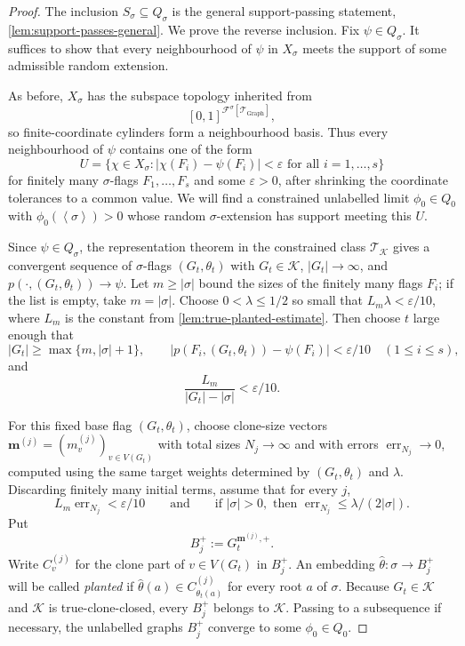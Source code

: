 \documentclass[11pt]{article}
\theoremstyle{definition}
\newcommand{\F}{\mathcal{F}}
\newcommand{\K}{\mathcal{K}}
\newcommand{\T}{\mathcal{T}}
\newcommand{\brak}[1]{\left\langle #1\right\rangle}
\newcommand{\eps}{\varepsilon}
\begin{document}
\begin{proof}
The inclusion $S_\sigma\subseteq Q_\sigma$ is the general support-passing
statement, \cref{lem:support-passes-general}.  We prove the reverse inclusion.
Fix $\psi\in Q_\sigma$.  It suffices to show that every neighbourhood of $\psi$
in $X_\sigma$ meets the support of some admissible random extension.

As before, $X_\sigma$ has the subspace topology inherited from
\[
  [0,1]^{\F^\sigma[\T_{\mathrm{Graph}}]},
\]
so finite-coordinate cylinders form a neighbourhood basis.  Thus every
neighbourhood of $\psi$ contains one of the form
\[
  U=
  \{\chi\in X_\sigma:
    |\chi(F_i)-\psi(F_i)|<\eps\text{ for all }i=1,\ldots,s\}
\]
for finitely many $\sigma$-flags $F_1,\ldots,F_s$ and some $\eps>0$, after
shrinking the coordinate tolerances to a common value.  We will find a
constrained unlabelled limit $\phi_0\in Q_0$ with $\phi_0(\brak\sigma)>0$ whose
random $\sigma$-extension has support meeting this $U$.

Since $\psi\in Q_\sigma$, the representation theorem in the constrained class
$\T_\K$ gives a convergent sequence of $\sigma$-flags
$(G_t,\theta_t)$ with $G_t\in\K$, $|G_t|\to\infty$, and
$p(\cdot,(G_t,\theta_t))\to\psi$.  Let $m\ge|\sigma|$ bound the sizes of the
finitely many flags $F_i$; if the list is empty, take $m=|\sigma|$.  Choose
$0<\lambda\le1/2$ so small that $L_m\lambda<\eps/10$, where $L_m$ is the
constant from \cref{lem:true-planted-estimate}.  Then choose $t$ large enough
that
\[
  |G_t|\ge\max\{m,|\sigma|+1\},\qquad
  |p(F_i,(G_t,\theta_t))-\psi(F_i)|<\eps/10\quad(1\le i\le s),
\]
and
\[
  \frac{L_m}{|G_t|-|\sigma|}<\eps/10 .
\]

For this fixed base flag $(G_t,\theta_t)$, choose clone-size vectors
$\mathbf m^{(j)}=(m_v^{(j)})_{v\in V(G_t)}$ with total sizes $N_j\to\infty$ and
with errors $\operatorname{err}_{N_j}\to0$, computed using the same target
weights determined by $(G_t,\theta_t)$ and $\lambda$.  Discarding finitely many
initial terms, assume that for every $j$,
\[
  L_m\operatorname{err}_{N_j}<\eps/10
  \qquad\text{and}\qquad
  \text{if }|\sigma|>0,\text{ then }
  \operatorname{err}_{N_j}\le\lambda/(2|\sigma|).
\]
Put
\[
  B_j^+:=G_t^{\mathbf m^{(j)},+}.
\]
Write $C_v^{(j)}$ for the clone part of $v\in V(G_t)$ in $B_j^+$.  An embedding
$\widehat\theta:\sigma\to B_j^+$ will be called \emph{planted} if
$\widehat\theta(a)\in C_{\theta_t(a)}^{(j)}$ for every root $a$ of
$\sigma$.
Because $G_t\in\K$ and $\K$ is true-clone-closed, every $B_j^+$ belongs to
$\K$.  Passing to a subsequence if necessary, the unlabelled graphs $B_j^+$
converge to some $\phi_0\in Q_0$.


\end{proof}
\end{document}
